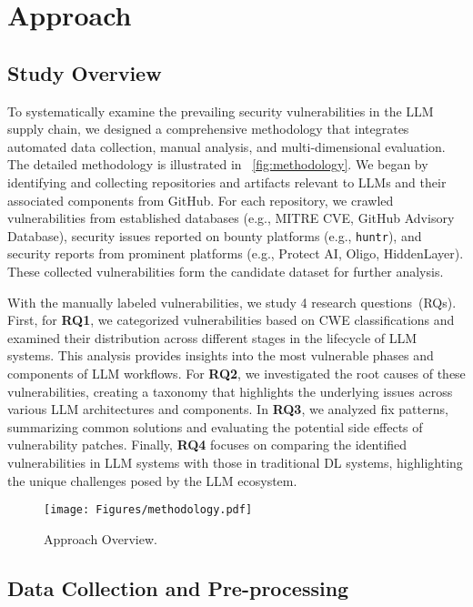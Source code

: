 \section{Approach}
\subsection{Study Overview}
To systematically examine the prevailing security vulnerabilities in the LLM supply chain, we designed a comprehensive methodology that integrates automated data collection, manual analysis, and multi-dimensional evaluation. 
The detailed methodology is illustrated in ~\autoref{fig:methodology}.
We began by identifying and collecting repositories and artifacts relevant to LLMs and their associated components from GitHub. For each repository, we crawled vulnerabilities from established databases (e.g., MITRE CVE, GitHub Advisory Database), security issues reported on bounty platforms (e.g., \texttt{huntr}), and security reports from prominent platforms (e.g., Protect AI, Oligo, HiddenLayer). These collected vulnerabilities form the candidate dataset for further analysis.

With the manually labeled vulnerabilities, we study 4 research questions~(RQs). First, for \textbf{RQ1}, we categorized vulnerabilities based on CWE classifications and examined their distribution across different stages in the lifecycle of LLM systems. This analysis provides insights into the most vulnerable phases and components of LLM workflows. For \textbf{RQ2}, we investigated the root causes of these vulnerabilities, creating a taxonomy that highlights the underlying issues across various LLM architectures and components. In \textbf{RQ3}, we analyzed fix patterns, summarizing common solutions and evaluating the potential side effects of vulnerability patches. Finally, \textbf{RQ4} focuses on comparing the identified vulnerabilities in LLM systems with those in traditional DL systems, highlighting the unique challenges posed by the LLM ecosystem.

\begin{figure*}[t]
    \centering
    \texttt{[image: Figures/methodology.pdf]}
    \caption{Approach Overview.}
    \label{fig:methodology}
\end{figure*}

\subsection{Data Collection and Pre-processing}

